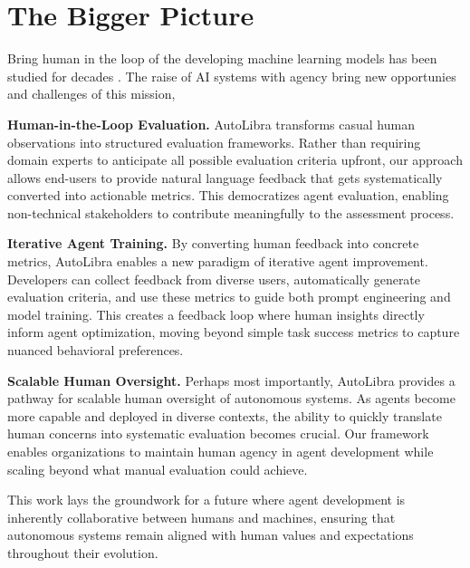 \documentclass[../main.tex]{subfiles}
\begin{document}
	\section{The Bigger Picture}

	Bring human in the loop of the developing machine learning models has been 
    studied for decades \citep{monarch2021human}. The raise of AI systems with
    agency bring new opportunies and challenges of this mission, 

	\textbf{Human-in-the-Loop Evaluation.} AutoLibra transforms casual human
	observations into structured evaluation frameworks. Rather than requiring domain
	experts to anticipate all possible evaluation criteria upfront, our approach
	allows end-users to provide natural language feedback that gets systematically
	converted into actionable metrics. This democratizes agent evaluation,
	enabling non-technical stakeholders to contribute meaningfully to the
	assessment process.

	\textbf{Iterative Agent Training.} By converting human feedback into concrete metrics,
	AutoLibra enables a new paradigm of iterative agent improvement. Developers can
	collect feedback from diverse users, automatically generate evaluation
	criteria, and use these metrics to guide both prompt engineering and model training.
	This creates a feedback loop where human insights directly inform agent
	optimization, moving beyond simple task success metrics to capture nuanced behavioral
	preferences.

	\textbf{Scalable Human Oversight.} Perhaps most importantly, AutoLibra provides
	a pathway for scalable human oversight of autonomous systems. As agents become
	more capable and deployed in diverse contexts, the ability to quickly translate
	human concerns into systematic evaluation becomes crucial. Our framework
	enables organizations to maintain human agency in agent development while
	scaling beyond what manual evaluation could achieve.

	This work lays the groundwork for a future where agent development is
	inherently collaborative between humans and machines, ensuring that autonomous
	systems remain aligned with human values and expectations throughout their evolution.
\end{document}
